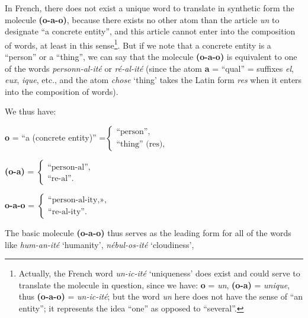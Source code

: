 \begin{sloppypar}
{{     In French, there does not exist a unique word to translate in
     synthetic form the molecule \textbf{(o-a-o)}, because
     there exists no other atom than the article \emph{un} to designate
     ``a concrete entity'', and this article cannot enter into the
     composition of words, at least in this sense\footnote{Actually,
       the French word \emph{un-ic-ité} `uniqueness' does exist and
       could serve to translate the molecule in question, since we
       have: \textbf{o} = \emph{un}, \textbf{(o-a)} =
       \emph{unique}, thus \textbf{(o-a-o)} = \emph{un-ic-ité};
       but the word \emph{un} here does not have the sense of ``an
       entity''; it represents the idea ``one'' as opposed to
       ``several''.}. But if we note that a concrete entity is a
     ``person'' or a ``thing'', we can say that the molecule
     \textbf{(o-a-o)} is equivalent to one of the words
     \emph{personn-al-ité} or \emph{ré-al-ité} (since the atom
     \textbf{a} = ``qual'' = suffixes \emph{el}, \emph{eux}, \emph{ique}, etc.,
     and the atom \emph{chose} `thing' takes the Latin form \emph{res} when
     it enters into the composition of words).

     We thus have:
     \begin{center}
       {\setlength{\arraycolsep}{0pt} \textbf{o} = ``a
         (concrete entity)'' =$\left\{
           \begin{array}{l}
             \mbox{``person'',}\\
             \mbox{``thing'' (res),}
           \end{array}
         \right.$
    
         \textbf{(o-a)} = $\left\{
           \begin{array}{l}
             \mbox{``person-al'',}\\
             \mbox{``re-al''.}
           \end{array}
         \right.$
    
         \textbf{o-a-o} = $\left\{
           \begin{array}{l}
             \mbox{``person-al-ity,»,}\\
             \mbox{``re-al-ity''.}
           \end{array}
         \right.$ }
     \end{center}

     The basic molecule \textbf{(o-a-o)} thus serves as the
     leading form for all of the words like \emph{hum-an-ité}
     `humanity', \emph{nébul-os-ité} `cloudiness',

}}
\end{sloppypar}
